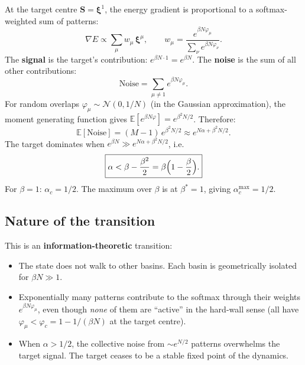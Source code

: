 \documentclass[11pt]{article}
\newcommand{\vp}{\varphi}
\newcommand{\bS}{\mathbf{S}}
\newcommand{\bxi}{\boldsymbol{\xi}}
\begin{document}
At the target centre $\bS = \bxi^1$, the energy gradient
is proportional to a softmax-weighted sum of patterns:
\begin{equation}
  \nabla E \propto \sum_\mu w_\mu\,\bxi^\mu, \qquad
  w_\mu = \frac{e^{\beta N\vp_\mu}}{\sum_\nu e^{\beta N\vp_\nu}}.
\end{equation}
The \textbf{signal} is the target's contribution:
$e^{\beta N \cdot 1} = e^{\beta N}$.
The \textbf{noise} is the sum of all other contributions:
\begin{equation}
  \text{Noise} = \sum_{\mu \neq 1} e^{\beta N\vp_\mu}.
\end{equation}
For random overlaps $\vp_\mu \sim \mathcal{N}(0, 1/N)$
(in the Gaussian approximation), the moment generating
function gives
$\mathbb{E}[e^{\beta N\vp}] = e^{\beta^2 N/2}$.
Therefore:
\begin{equation}\label{eq:Enoise}
  \mathbb{E}[\text{Noise}]
  = (M - 1)\,e^{\beta^2 N/2}
  \approx e^{N\alpha + \beta^2 N/2}.
\end{equation}
The target dominates when
$e^{\beta N} \gg e^{N\alpha + \beta^2 N/2}$, i.e.
\begin{equation}\label{eq:retrieval_condition}
  \boxed{%
  \alpha < \beta - \frac{\beta^2}{2}
  = \beta\Bigl(1 - \frac{\beta}{2}\Bigr).}
\end{equation}
For $\beta = 1$: $\alpha_c = 1/2$.
The maximum over $\beta$ is at $\beta^* = 1$, giving
$\alpha_c^{\max} = 1/2$.

\subsection{Nature of the transition}

This is an \textbf{information-theoretic} transition:
\begin{itemize}
  \item The state does not walk to other basins.
    Each basin is geometrically isolated for $\beta N \gg 1$.
  \item Exponentially many patterns contribute to the softmax
    through their weights $e^{\beta N\vp_\mu}$, even though
    \emph{none} of them are ``active'' in the hard-wall sense
    (all have $\vp_\mu < \vp_c = 1 - 1/(\beta N)$ at the
    target centre).
  \item When $\alpha > 1/2$, the collective noise from
    $\sim e^{N/2}$ patterns overwhelms the target signal.
    The target ceases to be a stable fixed point of the dynamics.
\end{itemize}
\end{document}
